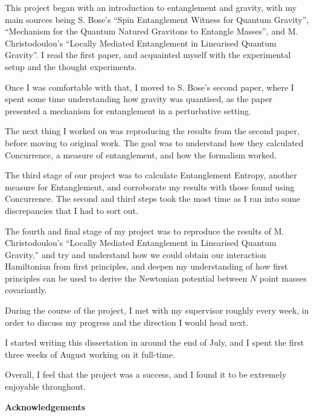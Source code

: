\documentclass[12pt,a4paper]{report}
\theoremstyle{plain}
\theoremstyle{definition}
\theoremstyle{remark}
\begin{document}
This project began with an introduction to entanglement and gravity, with my main sources being S. Bose's ``Spin Entanglement Witness for Quantum Gravity'', ``Mechanism for the Quantum Natured Gravitons to Entangle Masses'', and M. Christodoulou's ``Locally Mediated Entanglement in Linearised Quantum Gravity''. I read the first paper, and acquainted myself with the experimental setup and the thought experiments.

Once I was comfortable with that, I moved to S. Bose's second paper, where I spent some time understanding how gravity was quantised, as the paper presented a mechanism for entanglement in a perturbative setting.

The next thing I worked on was reproducing the results from the second paper, before moving to original work. The goal was to understand how they calculated Concurrence, a measure of entanglement, and how the formalism worked.

The third stage of our project was to calculate Entanglement Entropy, another measure for Entanglement, and corroborate my results with those found using Concurrence. The second and third steps took the most time as I ran into some discrepancies that I had to sort out.

The fourth and final stage of my project was to reproduce the results of M. Christodoulou's ``Locally Mediated Entanglement in Linearised Quantum Gravity,'' and try and understand how we could obtain our interaction Hamiltonian from first principles, and deepen my understanding of how first principles can be used to derive the Newtonian potential between $N$ point masses covariantly.

During the course of the project, I met with my supervisor roughly every week,
in order to discuss my progress and the direction I would head
next.

I started writing this dissertation in around the end of July, and I spent the first
three weeks of August working on it full-time.

Overall, I feel that the project was a success, and I found it to be
extremely enjoyable throughout.


\newpage

\begin{center}
\textbf{Acknowledgements}
\end{center}
\end{document}
